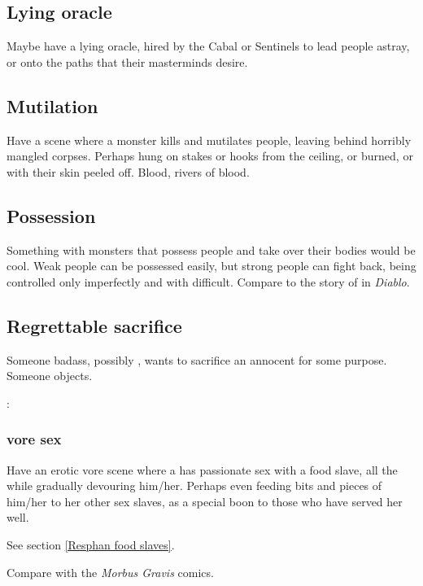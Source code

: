 \subsection{Lying oracle}
Maybe have a lying oracle, hired by the Cabal or Sentinels to lead people astray, or onto the paths that their masterminds desire. 









\subsection{Mutilation}
Have a scene where a monster kills and mutilates people, leaving behind horribly mangled corpses. Perhaps hung on stakes or hooks from the ceiling, or burned, or with their skin peeled off. Blood, rivers of blood.









\subsection{Possession}
Something with monsters that possess people and take over their bodies would be cool. Weak people can be possessed easily, but strong people can fight back, being controlled only imperfectly and with difficult. Compare to the story of  in \emph{Diablo}. 









\subsection{Regrettable sacrifice}
Someone badass, possibly , wants to sacrifice an annocent for some purpose. Someone objects. 

\Ishnaruchaefir: 





\subsubsection{\Resvil{} vore sex}
Have an erotic vore scene where a \resvil{} has passionate sex with a food slave, all the while gradually devouring him/her. 
Perhaps even feeding bits and pieces of him/her to her other sex slaves, as a special boon to those who have served her well. 

See section \ref{Resphan food slaves}. 

Compare with the \emph{Morbus Gravis} comics.




















